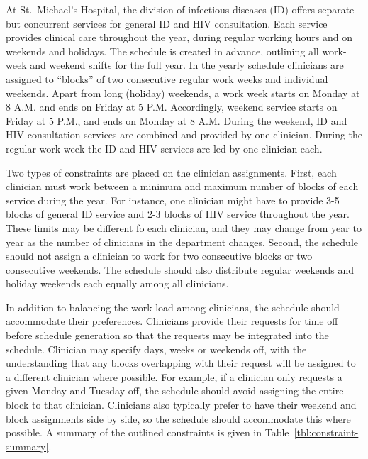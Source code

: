 At St.\ Michael's Hospital, the division of infectious diseases (ID) offers
separate but concurrent services for general ID and HIV consultation. Each
service provides clinical care throughout the year, during regular working hours
and on weekends and holidays. The schedule is created in advance,
outlining all work-week and weekend shifts for the full year.
In the yearly schedule clinicians are assigned to ``blocks'' of
two consecutive regular work weeks and individual weekends. Apart
from long (holiday) weekends, a work week starts on Monday at 8 A.M. and ends on
Friday at 5 P.M. Accordingly, weekend service starts on Friday at 5 P.M., and
ends on Monday at 8 A.M. During the weekend, ID and HIV consultation services
are combined and provided by one clinician. During the regular work week the ID
and HIV services are led by one clinician each.

Two types of constraints are placed on the clinician assignments. 
First, each clinician
must work between a minimum and maximum number of blocks of each service during the year.
For instance, one clinician might have to
provide 3-5 blocks of general ID service and 2-3 blocks of HIV service
throughout the year. These limits may be different fo each clinician,
and they may change from year to year as
the number of clinicians in the department changes. Second, the schedule
should not assign a clinician to work for two consecutive blocks or two
consecutive weekends. The schedule should also distribute regular
weekends and holiday weekends each equally among all clinicians.

In addition to balancing the work load among clinicians, the schedule
should accommodate their preferences. Clinicians provide their requests for
time off before schedule generation so that the requests may be integrated
into the schedule. Clinician may specify days, weeks or weekends off, with the
understanding that any blocks overlapping with their request will be assigned to
a different clinician where possible. For example, if a clinician only requests
a given Monday and Tuesday off, the schedule should avoid assigning the
entire block to that clinician. Clinicians also typically prefer to have their weekend and
block assignments side by side, so the schedule should accommodate this where possible.
A summary of the outlined constraints is given in
Table~\ref{tbl:constraint-summary}.

